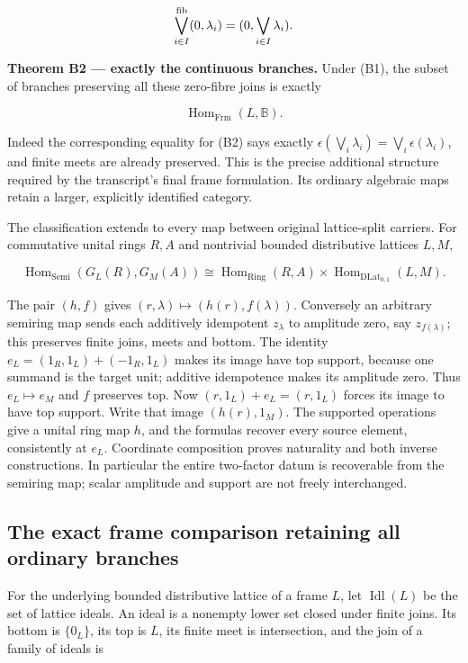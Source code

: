 \[
\bigvee_{i\in I}^{\rm fib}(0,\lambda_i)=(0,\bigvee_{i\in I}\lambda_i).
\]

\textbf{Theorem B2 --- exactly the continuous branches.} Under (B1), the subset of branches preserving all these zero-fibre joins is exactly

\[
\operatorname{Hom}_{\mathrm{Frm}}(L,\mathbb B).
\tag{B4}
\]

Indeed the corresponding equality for (B2) says exactly \(\epsilon(\bigvee_i\lambda_i)=\bigvee_i\epsilon(\lambda_i)\), and finite meets are already preserved. This is the precise additional structure required by the transcript's final frame formulation. Its ordinary algebraic maps retain a larger, explicitly identified category.

The classification extends to every map between original lattice-split carriers. For commutative unital rings \(R,A\) and nontrivial bounded distributive lattices \(L,M\),

\[
\operatorname{Hom}_{\mathrm{Semi}}(G_L(R),G_M(A))
\cong\operatorname{Hom}_{\mathrm{Ring}}(R,A)
\times\operatorname{Hom}_{\mathrm{DLat}_{0,1}}(L,M).
\tag{B5}
\]

The pair \((h,f)\) gives \((r,\lambda )\mapsto (h(r),f(\lambda ))\). Conversely an arbitrary semiring map sends each additively idempotent \(z_\lambda\) to amplitude zero, say \(z_{f(\lambda)}\); this preserves finite joins, meets and bottom. The identity \(e_L=(1_R,1_L)+(-1_R,1_L)\) makes its image have top support, because one summand is the target unit; additive idempotence makes its amplitude zero. Thus \(e_L\mapsto e_M\) and \(f\) preserves top. Now \((r,1_L)+e_L=(r,1_L)\) forces its image to have top support. Write that image \((h(r),1_M)\). The supported operations give a unital ring map \(h\), and the formulas recover every source element, consistently at \(e_L\). Coordinate composition proves naturality and both inverse constructions. In particular the entire two-factor datum is recoverable from the semiring map; scalar amplitude and support are not freely interchanged.

\subsection{The exact frame comparison retaining all ordinary branches}\label{historical-support-the-exact-frame-comparison-retaining-all-ordinary-branches}

For the underlying bounded distributive lattice of a frame \(L\), let \(\operatorname{Idl}(L)\) be the set of lattice ideals. An ideal is a nonempty lower set closed under finite joins. Its bottom is \(\{0_L\}\), its top is \(L\), its finite meet is intersection, and the join of a family of ideals is

